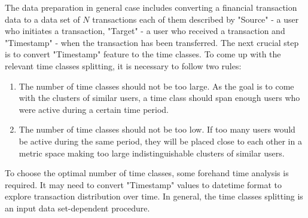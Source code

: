 The data preparation in general case includes converting a financial transaction data to a data set of $N$ transactions each of them described by "Source" - a user who initiates a transaction, "Target" - a user who received a transaction and "Timestamp" - when the transaction has been transferred. The next crucial step is to convert "Timestamp" feature to the time classes. To come up with the relevant time classes splitting, it is necessary to follow two rules: 
\begin{enumerate}
    \item The number of time classes should not be too large. As the goal is to come with the clusters of similar users, a time class should span enough users who were active during a certain time period.
    \item The number of time classes should not be too low. If too many users would be active during the same period, they will be placed close to each other in a metric space making too large indistinguishable clusters of similar users. 
\end{enumerate}
To choose the optimal number of time classes, some forehand time analysis is required. It may need to convert "Timestamp" values to datetime format to explore transaction distribution over time. In general, the time classes splitting is an input data set-dependent procedure.

